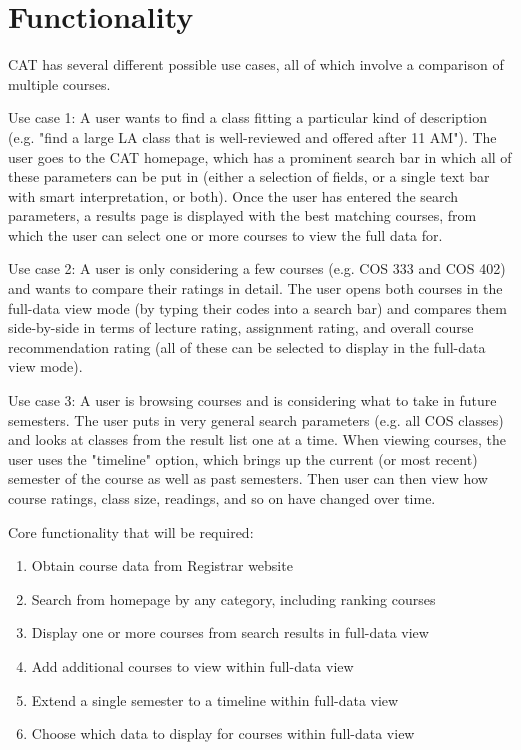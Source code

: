 \documentclass[11pt]{article}
\begin{document}
\section{Functionality}
CAT has several different possible use cases, all of which involve a comparison of multiple courses.
\par Use case 1: A user wants to find a class fitting a particular kind of description (e.g. "find a large LA class that is well-reviewed and offered after 11 AM"). The user goes to the CAT homepage, which has a prominent search bar in which all of these parameters can be put in (either a selection of fields, or a single text bar with smart interpretation, or both). Once the user has entered the search parameters, a results page is displayed with the best matching courses, from which the user can select one or more courses to view the full data for.
\par Use case 2: A user is only considering a few courses (e.g. COS 333 and COS 402) and wants to compare their ratings in detail. The user opens both courses in the full-data view mode (by typing their codes into a search bar) and compares them side-by-side in terms of lecture rating, assignment rating, and overall course recommendation rating (all of these can be selected to display in the full-data view mode).
\par Use case 3: A user is browsing courses and is considering what to take in future semesters. The user puts in very general search parameters (e.g. all COS classes) and looks at classes from the result list one at a time. When viewing courses, the user uses the "timeline" option, which brings up the current (or most recent) semester of the course as well as past semesters. Then user can then view how course ratings, class size, readings, and so on have changed over time.
\par Core functionality that will be required:

\begin{enumerate}
\item Obtain course data from Registrar website
\item Search from homepage by any category, including ranking courses
\item Display one or more courses from search results in full-data view
\item Add additional courses to view within full-data view
\item Extend a single semester to a timeline within full-data view
\item Choose which data to display for courses within full-data view
\end{enumerate}
\end{document}
